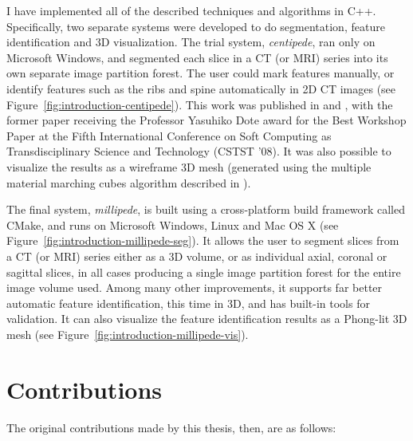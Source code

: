 I have implemented all of the described techniques and algorithms in C++. Specifically, two separate systems were developed to do segmentation, feature identification and 3D visualization. The trial system, \emph{centipede}, ran only on Microsoft Windows, and segmented each slice in a CT (or MRI) series into its own separate image partition forest. The user could mark features manually, or identify features such as the ribs and spine automatically in 2D CT images (see Figure~\ref{fig:introduction-centipede}). This work was published in \cite{gvccimi08} and \cite{gvcispa09}, with the former paper receiving the Professor Yasuhiko Dote award for the Best Workshop Paper at the Fifth International Conference on Soft Computing as Transdisciplinary Science and Technology (CSTST '08). It was also possible to visualize the results as a wireframe 3D mesh (generated using the multiple material marching cubes algorithm described in \cite{wu03}).


The final system, \emph{millipede}, is built using a cross-platform build framework called CMake, and runs on Microsoft Windows, Linux and Mac OS X (see Figure~\ref{fig:introduction-millipede-seg}). It allows the user to segment slices from a CT (or MRI) series either as a 3D volume, or as individual axial, coronal or sagittal slices, in all cases producing a single image partition forest for the entire image volume used. Among many other improvements, it supports far better automatic feature identification, this time in 3D, and has built-in tools for validation. It can also visualize the feature identification results as a Phong-lit 3D mesh (see Figure~\ref{fig:introduction-millipede-vis}).

\section*{Contributions}

The original contributions made by this thesis, then, are as follows:

